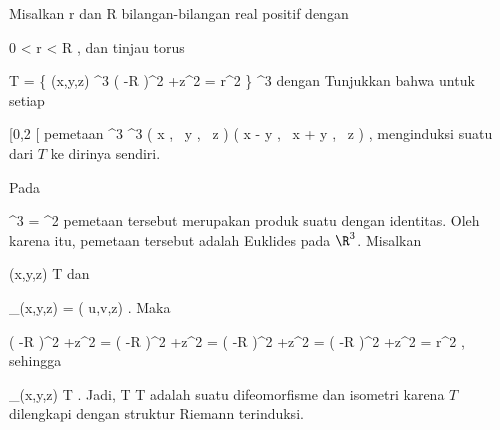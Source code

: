 {

Misalkan
\mathkor {} {r} {dan} {R} {}
bilangan-bilangan real positif dengan

\mavergleichskette
{\vergleichskette
{ 0
}
{ < }{ r
}
{ < }{ R
}
{    }{
}
{   }{
}
}
{}{}{,}
dan tinjau torus
 {} {}

\mavergleichskettedisp
{\vergleichskette
{ T
}
{ =} { \left\{ (x,y,z) \in \R^3  \mid   \left(   -R  \right)^2 +z^2  = r^2         \right\}
}
{ \subseteq} { \R^3
}
{ } {
}
{ } {
}
}
{}{}{}
dengan
Tunjukkan bahwa untuk setiap

\mavergleichskette
{\vergleichskette
{ \alpha
}
{ \in }{ [0,2 \pi [
}
{  }{
}
{    }{
}
{   }{
}
}
{}{}{}
pemetaan
\maabbeledisp {\Psi_\alpha} {\R^3} {\R^3
} { \left(  x   , \,   y  , \,  z                 \right) } { \left(  x \cos \alpha - y \sin  \alpha   , \,   x \sin \alpha + y \cos  \alpha  , \,  z                 \right)
} {,}
menginduksi suatu
dari $T$ ke dirinya sendiri.

}
{

Pada

\mavergleichskettedisp
{\vergleichskette
{ \R^3
}
{ =} { \R^2 \times \R
}
{ } {
}
{ } {
}
{ } {
}
}
{}{}{}
pemetaan tersebut merupakan produk suatu
dengan identitas. Oleh karena itu, pemetaan tersebut adalah
Euklides pada $\R^3$. Misalkan

\mavergleichskette
{\vergleichskette
{ (x,y,z)
}
{ \in }{  T
}
{  }{
}
{    }{
}
{   }{
}
}
{}{}{}
dan

\mavergleichskettedisp
{\vergleichskette
{ \Psi_\alpha(x,y,z)
}
{ =} { ( u,v,z)
}
{ } {
}
{ } {
}
{ } {
}
}
{}{}{.}
Maka

\mavergleichskettealigndrucklinks
{\vergleichskettealigndrucklinks
{ \left(   -R  \right)^2 +z^2
}
{ =} { \left(   -R  \right)^2 +z^2
}
{ =} { \left(   -R  \right)^2 +z^2
}
{ =} { \left(   -R  \right)^2 +z^2
}
{ =} { r^2
}
}
{}{}{,}
sehingga

\mavergleichskette
{\vergleichskette
{ \Psi_\alpha(x,y,z)
}
{ \in }{  T
}
{  }{
}
{    }{
}
{   }{
}
}
{}{}{.}
Jadi,
\maabbdisp {\Psi_\alpha} { T} {T
} {}
adalah suatu difeomorfisme dan isometri karena $T$ dilengkapi dengan struktur Riemann terinduksi.

 }

